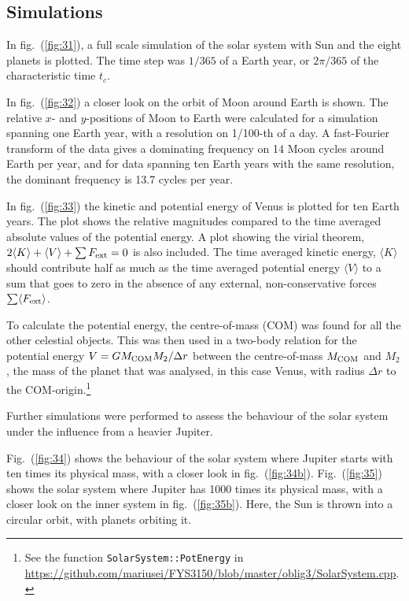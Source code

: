\documentclass[a4paper,11pt]{article}
\begin{document}
\subsection{Simulations}
In fig.~(\ref{fig:31}), a full scale simulation of the solar system with Sun and the eight planets is plotted.  The time step was $1/365$ of a Earth year, or $2\pi /365$ of the characteristic time $t_c$. 

In fig.~(\ref{fig:32}) a closer look on the orbit of Moon around Earth is shown. The relative $x$- and $y$-positions of Moon to Earth were calculated for a simulation spanning one Earth year, with a resolution on 1/100-th of a day. A fast-Fourier transform of the data gives a dominating frequency on 14 Moon cycles around Earth per year, and for data spanning ten Earth years with the same resolution, the dominant frequency is 13.7 cycles per year. 

In fig.~(\ref{fig:33}) the kinetic and potential energy of Venus is plotted for ten Earth years. The plot shows the relative magnitudes compared to the time averaged absolute values of the potential energy. A plot showing the virial theorem, $2\langle K \rangle + \langle V \rangle + \sum F_{\rm ext} = 0$ is also included. The time averaged kinetic energy, $\langle K \rangle$ should contribute half as much as the time averaged potential energy $\langle V \rangle $ to a sum that goes to zero in the absence of any external, non-conservative forces $\sum \langle F_{\rm ext} \rangle$. 

To calculate the potential energy, the centre-of-mass (COM) was found for all the other celestial objects. This was then used in a two-body relation for the potential energy $V = G M_{\rm COM} M_2 / \Delta r$ between the centre-of-mass $M_{\rm COM}$ and $M_2$, the mass of the planet that was analysed, in this case Venus, with radius $\Delta r$ to the COM-origin.\footnote{See the function \texttt{SolarSystem::PotEnergy} in \url{https://github.com/mariusei/FYS3150/blob/master/oblig3/SolarSystem.cpp}.} 

Further simulations were performed to assess the behaviour of the solar system under the influence from a heavier Jupiter. 

Fig.~(\ref{fig:34}) shows the behaviour of the solar system where Jupiter starts with ten times its physical mass, with a closer look in fig.~(\ref{fig:34b}). Fig.~(\ref{fig:35}) shows the solar system where Jupiter has 1000 times its physical mass, with a closer look on the inner system in fig.~(\ref{fig:35b}). Here, the Sun is thrown into a circular orbit, with planets orbiting it.   
\end{document}
